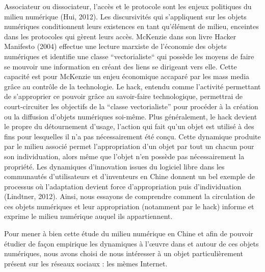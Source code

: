 Associateur ou dissociateur, l’accès et le protocole sont les enjeux politiques du milieu numérique (Hui, 2012). Les discursivités qui s’appliquent sur les objets numériques conditionnent leurs existences en tant qu’élément de milieu, enceintes dans les protocoles qui gèrent leurs accès. McKenzie dans son livre Hacker Manifesto (2004) effectue une lecture marxiste de l’économie des objets numériques et identifie une classe “vectorialiste“ qui possède les moyens de faire se mouvoir une information en créant des liens se dirigeant vers elle. Cette capacité est pour McKenzie un enjeu économique accaparé par les mass media grâce au contrôle de la technologie. Le hack, entendu comme l’activité permettant de s’approprier ce pouvoir grâce au savoir-faire technologique, permettrai de court-circuiter les objectifs de la “classe vectorialiste” pour procéder à la création ou la diffusion d’objets numériques soi-même. Plus généralement, le hack devient le propre du détournement d’usage, l’action qui fait qu’un objet est utilisé à des fins pour lesquelles il n’a pas nécessairement été conçu. Cette dynamique produite par le milieu associé permet l’appropriation d’un objet par tout un chacun pour son individuation, alors même que l’objet n’en possède pas nécessairement la propriété. Les dynamiques d’innovation issues du logiciel libre dans les communautés d’utilisateurs et d’inventeurs en Chine donnent un bel exemple de processus où l’adaptation devient force d’appropriation puis d’individuation (Lindtner, 2012). Ainsi, nous essayons de comprendre comment la circulation de ces objets numériques et leur appropriation (notamment par le hack) informe et exprime le milieu numérique auquel ils appartiennent. 


Pour mener à bien cette étude du milieu numérique en Chine et afin de pouvoir étudier de façon empirique les dynamiques à l’œuvre dans et autour de ces objets numériques, nous avons choisi de nous intéresser à un objet particulièrement présent sur les réseaux sociaux : les mèmes Internet. 


